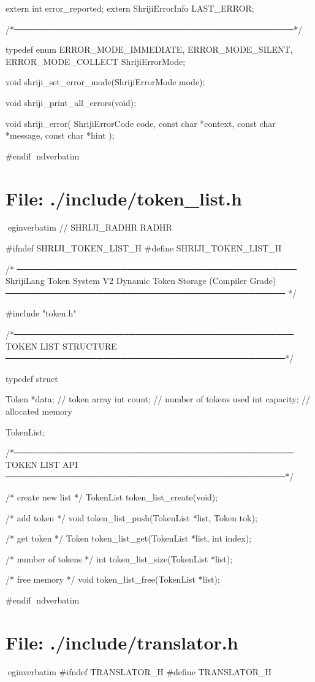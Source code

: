 \documentclass{article}
\begin{document}
extern int error_reported;
extern ShrijiErrorInfo LAST_ERROR;

/*──────────────────────────────────────────────*/

typedef enum {
    ERROR_MODE_IMMEDIATE,
    ERROR_MODE_SILENT,
    ERROR_MODE_COLLECT
} ShrijiErrorMode;

void shriji_set_error_mode(ShrijiErrorMode mode);

void shriji_print_all_errors(void);

void shriji_error(
    ShrijiErrorCode code,
    const char *context,
    const char *message,
    const char *hint
);

#endif
nd{verbatim}
\section*{File: ./include/token_list.h}
egin{verbatim}
// SHRIJI_RADHR RADHR

#ifndef SHRIJI_TOKEN_LIST_H
#define SHRIJI_TOKEN_LIST_H

/*
──────────────────────────────────────────────
 ShrijiLang Token System V2
 Dynamic Token Storage (Compiler Grade)
──────────────────────────────────────────────
*/

#include "token.h"

/*──────────────────────────────────────────────
  TOKEN LIST STRUCTURE
──────────────────────────────────────────────*/

typedef struct
{
    Token *data;      // token array
    int count;        // number of tokens used
    int capacity;     // allocated memory

} TokenList;


/*──────────────────────────────────────────────
  TOKEN LIST API
──────────────────────────────────────────────*/

/* create new list */
TokenList token_list_create(void);

/* add token */
void token_list_push(TokenList *list, Token tok);

/* get token */
Token token_list_get(TokenList *list, int index);

/* number of tokens */
int token_list_size(TokenList *list);

/* free memory */
void token_list_free(TokenList *list);


#endif
nd{verbatim}
\section*{File: ./include/translator.h}
egin{verbatim}
#ifndef TRANSLATOR_H
#define TRANSLATOR_H
\end{document}
